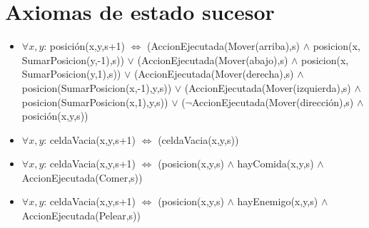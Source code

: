 \section{Axiomas de estado sucesor}


\begin{itemize}

\item $\forall x,y$: posición(x,y,s+1) $\Leftrightarrow$
\newline (AccionEjecutada(Mover(arriba),s) $\land$ posicion(x, SumarPosicion(y,-1),s))
\newline $\lor$
\newline (AccionEjecutada(Mover(abajo),s) $\land$ posicion(x, SumarPosicion(y,1),s))
\newline $\lor$
\newline (AccionEjecutada(Mover(derecha),s) $\land$ posicion(SumarPosicion(x,-1),y,s))
\newline $\lor$
\newline (AccionEjecutada(Mover(izquierda),s) $\land$ posicion(SumarPosicion(x,1),y,s))
\newline $\lor$
\newline ($\lnot$AccionEjecutada(Mover(dirección),s) $\land$ posición(x,y,s))



\item $\forall x,y$: celdaVacia(x,y,s+1) $\Leftrightarrow$ (celdaVacia(x,y,s))

\item $\forall x,y$: celdaVacia(x,y,s+1) $\Leftrightarrow$
\newline (posicion(x,y,s) $\land$ hayComida(x,y,s) $\land$ AccionEjecutada(Comer,s))

\item $\forall x,y$: celdaVacia(x,y,s+1) $\Leftrightarrow$
\newline (posicion(x,y,s) $\land$ hayEnemigo(x,y,s) $\land$ AccionEjecutada(Pelear,s))




\end{itemize}
